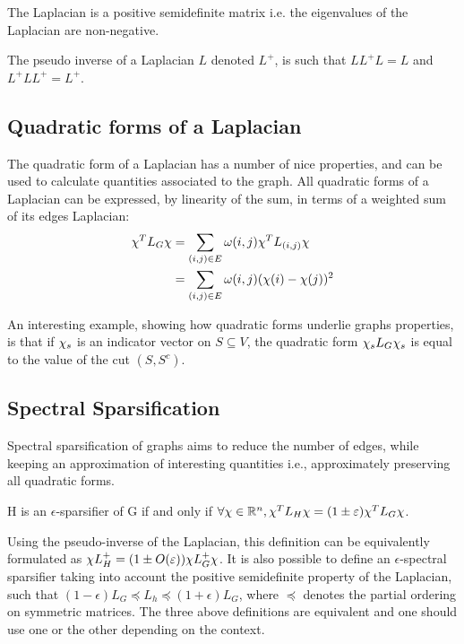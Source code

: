 The Laplacian is a positive semidefinite matrix i.e. the eigenvalues of the
Laplacian are non-negative.

The pseudo inverse of a Laplacian $L$ denoted $L^+$, is such that $LL^+L = L$
and $L^+LL^+ = L^+$.


\subsection{Quadratic forms of a Laplacian}
The quadratic form of a Laplacian has a number of nice properties, and can be
used to calculate quantities associated to the graph. All quadratic forms of a
Laplacian can be expressed, by linearity of the sum, in terms of a weighted sum
of its edges Laplacian:
\begin{equation}
    \begin{aligned}
        \chi^T L_G \chi
            & = \sum_{(i,j)\in E} \omega(i,j)\chi^T L_{(i,j)}\chi \\
            & = \sum_{(i,j)\in E} \omega(i,j)(\chi(i) - \chi(j))^2
    \end{aligned}
\end{equation}

An interesting example, showing how quadratic forms underlie graphs properties,
is that if $\chi_s$ is an indicator vector on $S \subseteq V$, the quadratic form
$\chi_s L_G \chi_s$ is equal to the value of the cut $(S, S^c)$.

\subsection{Spectral Sparsification}

Spectral sparsification of graphs aims to reduce the number of edges, while
keeping an approximation of interesting quantities i.e., approximately preserving
all quadratic forms.

\begin{definition}
    H is an $\epsilon$-sparsifier of G if and only if $\forall \chi \in
    \mathbb{R}^n, \chi^T L_H \chi = (1 \pm \varepsilon)\chi^T L_G \chi$.
\end{definition}

Using the pseudo-inverse of the Laplacian, this definition can be equivalently
formulated as $\chi L_H^+ = (1 \pm O(\varepsilon)) \chi L_G^+\chi$. It is also possible
to define an $\epsilon$-spectral sparsifier taking into account the positive
semidefinite property of the Laplacian, such that $(1-\epsilon) L_G \preccurlyeq
L_h \preccurlyeq (1+\epsilon) L_G$, where $\preccurlyeq$ denotes the partial
ordering on symmetric matrices. The three above definitions are equivalent and
one should use one or the other depending on the context.

